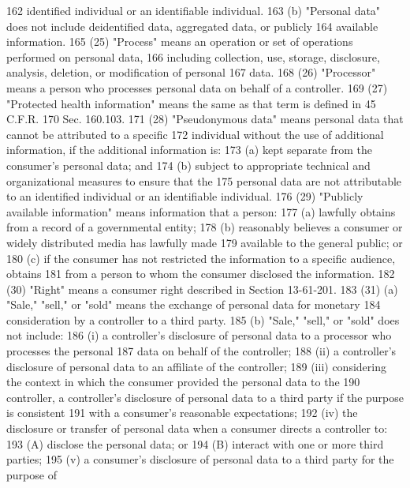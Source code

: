 162     identified individual or an identifiable individual.
163          (b) "Personal data" does not include deidentified data, aggregated data, or publicly
164     available information.
165          (25) "Process" means an operation or set of operations performed on personal data,
166     including collection, use, storage, disclosure, analysis, deletion, or modification of personal
167     data.
168          (26) "Processor" means a person who processes personal data on behalf of a controller.
169          (27) "Protected health information" means the same as that term is defined in 45 C.F.R.
170     Sec. 160.103.
171          (28) "Pseudonymous data" means personal data that cannot be attributed to a specific
172     individual without the use of additional information, if the additional information is:
173          (a) kept separate from the consumer's personal data; and
174          (b) subject to appropriate technical and organizational measures to ensure that the
175     personal data are not attributable to an identified individual or an identifiable individual.
176          (29) "Publicly available information" means information that a person:
177          (a) lawfully obtains from a record of a governmental entity;
178          (b) reasonably believes a consumer or widely distributed media has lawfully made
179     available to the general public; or
180          (c) if the consumer has not restricted the information to a specific audience, obtains
181     from a person to whom the consumer disclosed the information.
182          (30) "Right" means a consumer right described in Section 13-61-201.
183          (31) (a) "Sale," "sell," or "sold" means the exchange of personal data for monetary
184     consideration by a controller to a third party.
185          (b) "Sale," "sell," or "sold" does not include:
186          (i) a controller's disclosure of personal data to a processor who processes the personal
187     data on behalf of the controller;
188          (ii) a controller's disclosure of personal data to an affiliate of the controller;
189          (iii) considering the context in which the consumer provided the personal data to the
190     controller, a controller's disclosure of personal data to a third party if the purpose is consistent
191     with a consumer's reasonable expectations;
192          (iv) the disclosure or transfer of personal data when a consumer directs a controller to:
193          (A) disclose the personal data; or
194          (B) interact with one or more third parties;
195          (v) a consumer's disclosure of personal data to a third party for the purpose of
